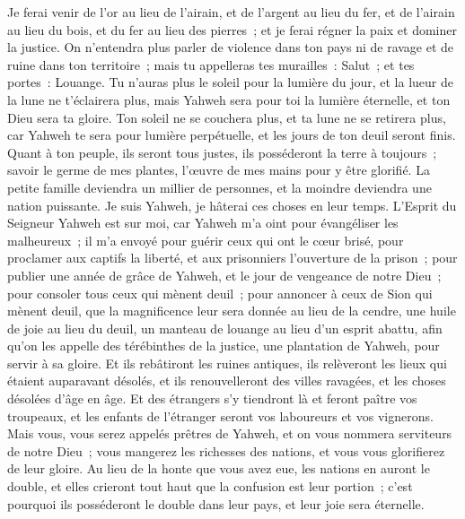 \begin{multicols}{2}
Je ferai venir de l'or au lieu de l'airain, et de l'argent au lieu du fer, et de l'airain au lieu du bois, et du fer au lieu des pierres~; et je ferai régner la paix et dominer la justice.
On n'entendra plus parler de violence dans ton pays ni de ravage et de ruine dans ton territoire~; mais tu appelleras tes murailles~: Salut~; et tes portes~: Louange.
Tu n'auras plus le soleil pour la lumière du jour, et la lueur de la lune ne t'éclairera plus, mais Yahweh sera pour toi la lumière éternelle, et ton Dieu sera ta gloire.
Ton soleil ne se couchera plus, et ta lune ne se retirera plus, car Yahweh te sera pour lumière perpétuelle, et les jours de ton deuil seront finis.
Quant à ton peuple, ils seront tous justes, ils posséderont la terre à toujours~; savoir le germe de mes plantes, l'œuvre de mes mains pour y être glorifié.
La petite famille deviendra un millier de personnes, et la moindre deviendra une nation puissante. Je suis Yahweh, je hâterai ces choses en leur temps.
\VerseOne{}L'Esprit du Seigneur Yahweh est sur moi, car Yahweh m'a oint pour évangéliser les malheureux~; il m'a envoyé pour guérir ceux qui ont le cœur brisé, pour proclamer aux captifs la liberté, et aux prisonniers l'ouverture de la prison~;
pour publier une année de grâce de Yahweh, et le jour de vengeance de notre Dieu~; pour consoler tous ceux qui mènent deuil~;
pour annoncer à ceux de Sion qui mènent deuil, que la magnificence leur sera donnée au lieu de la cendre, une huile de joie au lieu du deuil, un manteau de louange au lieu d'un esprit abattu, afin qu'on les appelle des térébinthes de la justice, une plantation de Yahweh, pour servir à sa gloire.
Et ils rebâtiront les ruines antiques, ils relèveront les lieux qui étaient auparavant désolés, et ils renouvelleront des villes ravagées, et les choses désolées d'âge en âge.
Et des étrangers s'y tiendront là et feront paître vos troupeaux, et les enfants de l'étranger seront vos laboureurs et vos vignerons.
Mais vous, vous serez appelés prêtres de Yahweh, et on vous nommera serviteurs de notre Dieu~; vous mangerez les richesses des nations, et vous vous glorifierez de leur gloire.
Au lieu de la honte que vous avez eue, les nations en auront le double, et elles crieront tout haut que la confusion est leur portion~; c'est pourquoi ils posséderont le double dans leur pays, et leur joie sera éternelle.

\end{multicols}
